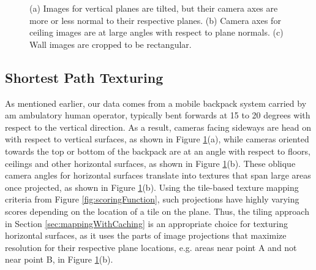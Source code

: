 \documentclass[]{spie}  %
\begin{document}
\begin{figure}
  \centering
  \hspace{0.51in} \centering
  \centering \hspace{0.5in}
  \caption{(a) Images for vertical planes are tilted, but their camera
    axes are more or less normal to their respective planes. (b)
    Camera axes for ceiling images are at large angles with respect to
    plane normals. (c) Wall images are cropped to be rectangular.}
  \label{fig:projectionAngles}
\end{figure}

\subsection{Shortest Path Texturing}
\label{sec:shortestPath}

As mentioned earlier, our data comes from a mobile backpack system
carried by am ambulatory human operator, typically bent forwards at 15
to 20 degrees with respect to the vertical direction. As a result,
cameras facing sideways are head on with respect to vertical surfaces,
as shown in Figure \ref{fig:projectionAngles}(a), while cameras
oriented towards the top or bottom of the backpack are at an angle
with respect to floors, ceilings and other horizontal surfaces, as
shown in Figure \ref{fig:projectionAngles}(b). These oblique camera
angles for horizontal surfaces translate into textures that span large
areas once projected, as shown in Figure
\ref{fig:projectionAngles}(b). Using the tile-based texture mapping
criteria from Figure \ref{fig:scoringFunction}, such projections have
highly varying scores depending on the location of a tile on the
plane. Thus, the tiling approach in Section
\ref{sec:mappingWithCaching} is an appropriate choice for texturing
horizontal surfaces, as it uses the parts of image projections that
maximize resolution for their respective plane locations, e.g. areas
near point A and not near point B, in Figure
\ref{fig:projectionAngles}(b).
\end{document}
